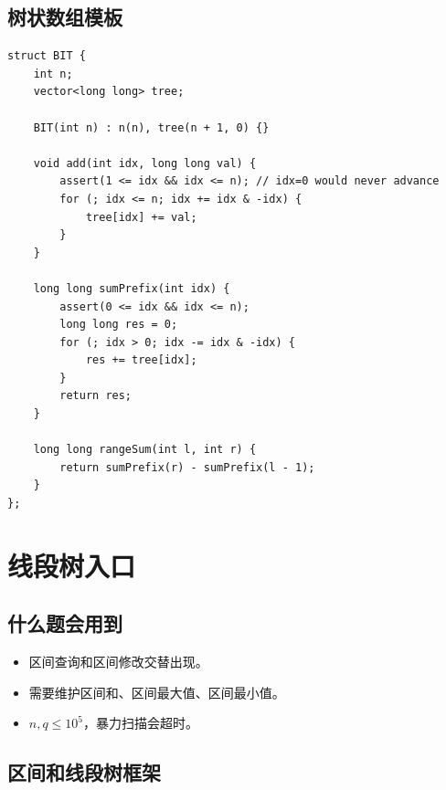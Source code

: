 \subsection{树状数组模板}

\begin{lstlisting}
struct BIT {
    int n;
    vector<long long> tree;

    BIT(int n) : n(n), tree(n + 1, 0) {}

    void add(int idx, long long val) {
        assert(1 <= idx && idx <= n); // idx=0 would never advance
        for (; idx <= n; idx += idx & -idx) {
            tree[idx] += val;
        }
    }

    long long sumPrefix(int idx) {
        assert(0 <= idx && idx <= n);
        long long res = 0;
        for (; idx > 0; idx -= idx & -idx) {
            res += tree[idx];
        }
        return res;
    }

    long long rangeSum(int l, int r) {
        return sumPrefix(r) - sumPrefix(l - 1);
    }
};
\end{lstlisting}


\section{线段树入口}\label{sec:08-9}

\subsection{什么题会用到}

\begin{itemize}
  \item 区间查询和区间修改交替出现。
  \item 需要维护区间和、区间最大值、区间最小值。
  \item $n,q \le 10^5$，暴力扫描会超时。
\end{itemize}

\subsection{区间和线段树框架}

